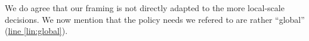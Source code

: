 \documentclass[11pt,letter]{article}
\begin{document}
We do agree that our framing is not directly adapted to the more local-scale decisions. We now mention that the policy needs we refered to are rather ``global'' (\href{file:forecastflows_r2\#lintarget:global}{line \ref*{lin:global}}).


\end{document}
